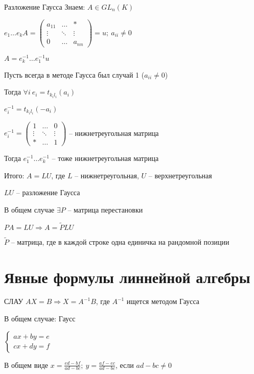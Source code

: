 \documentclass[12pt]{article}
\begin{document}
\begin{nota}{Разложение Гаусса}
    Знаем: $A \in GL_n(K)$

    $e_1 \ldots e_k A = \begin{pmatrix}
        a_{11} & \ldots & * \\
        \vdots & \ddots & \vdots \\
        0 & \ldots & a_{nn}
    \end{pmatrix} = u;\ a_{ii} \neq 0$

    $A = e_k^{-1} \ldots e_1^{-1}u$

    Пусть всегда в методе Гаусса был случай 1 ($a_{ii} \neq 0$)

    Тогда $\forall i\ e_i = t_{k_il_i}(a_i)$

    $e_i^{-1} = t_{k_il_i}(-a_i)$

    $e_i^{-1} = \begin{pmatrix}
        1 & \ldots & 0 \\
        \vdots & \ddots & \vdots \\
        * & \ldots & 1
    \end{pmatrix}$ -- нижнетреугольная матрица

    Тогда $e_1^{-1} \ldots e_k^{-1}$ -- тоже нижнетреугольная матрица

    Итого: $A = LU$, где $L$ -- нижнетреугольная, $U$ -- верхнетреугольная

    $LU$ -- разложение Гаусса

    В общем случае $\exists P$ -- матрица перестановки

    $PA = LU \Rightarrow A = \tilde{P}LU$

    $\tilde{P}$ -- матрица, где в каждой строке одна единичка на рандомной позиции
\end{nota}

\section{Явные формулы линнейной алгебры}

СЛАУ $AX = B \Rightarrow X = A^{-1}B$, где $A^{-1}$ ищется методом Гаусса

В общем случае: Гаусс

$\begin{cases}
    ax + by = e \\
    cx + dy = f 
\end{cases}$

В общем виде $x = \frac{ed - bf}{ad - bc};\ y = \frac{af - ec}{ad - bc}$, если $ad - bc \neq 0$
\end{document}
